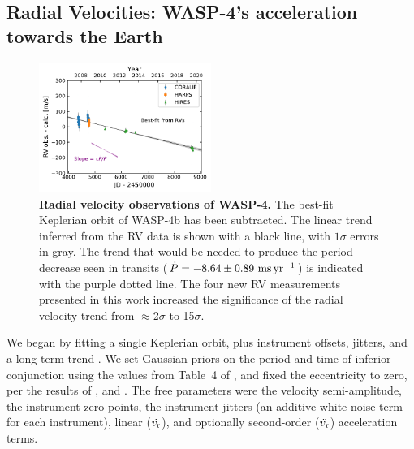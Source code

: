 \documentclass[12pt,twocolumn,tighten]{aastex62}
\begin{document}
\subsection{Radial Velocities: WASP-4's acceleration towards the Earth}

\begin{figure}[t]
	\begin{center}
		\leavevmode
		\includegraphics[width=0.5\textwidth]{f2.pdf}
	\end{center}
	\vspace{-0.7cm}
	\caption{
    {\bf Radial velocity observations of WASP-4.} The best-fit Keplerian orbit
    of WASP-4b has been subtracted.  The linear trend inferred from the
    RV data is shown with a black line, with $1\sigma$ errors in gray.
    The trend that would be needed to produce the period decrease seen
    in transits ($\dot{P}= - 8.64 \pm 0.89~{\rm ms}\,{\rm yr}^{-1}$) is
    indicated with the purple dotted line.  The four new RV
    measurements presented in this work increased the significance of
    the radial velocity trend from $\approx$2$\sigma$ to 15$\sigma$.
	\label{fig:rvs}
  \vspace{-0.3cm}
	}
\end{figure}

We began by fitting a single Keplerian orbit, plus instrument offsets,
jitters, and a long-term trend
\citep[][\texttt{radvel}]{fulton_radvel_2018}.  We set Gaussian priors
on the period and time of inferior conjunction using the values from
Table~4 of , and fixed the eccentricity
to zero, per the results of \citet{beerer_secondary_2011},
\citet{knutson_friends_2014} and \citet{bonomo_gaps_2017}.  The free
parameters were the velocity semi-amplitude, the instrument
zero-points, the instrument jitters (an additive white noise term for
each instrument), linear ($\dot{v_{\rm r}}$), and optionally
second-order ($\ddot{v_{\rm r}}$) acceleration terms.
\end{document}
